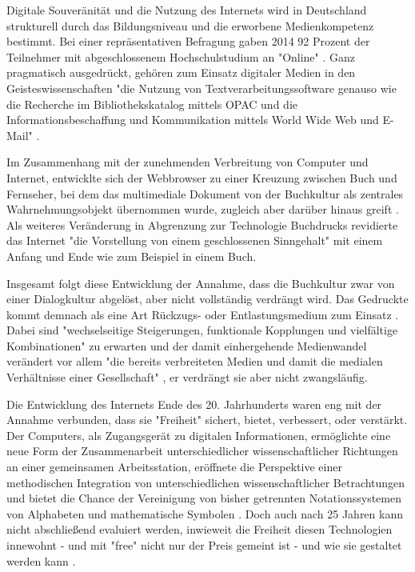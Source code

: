 Digitale Souveränität und die Nutzung des Internets wird in Deutschland strukturell durch das Bildungsniveau und die erworbene Medienkompetenz bestimmt. Bei einer repräsentativen Befragung gaben 2014 92 Prozent der Teilnehmer mit abgeschlossenem Hochschulstudium an "Online" \cite{nonliner_2014}. Ganz pragmatisch ausgedrückt, gehören zum Einsatz digitaler Medien in den Geisteswissenschaften "die Nutzung von Textverarbeitungssoftware genauso wie die Recherche im Bibliothekskatalog mittels OPAC und die Informationsbeschaffung und Kommunikation mittels World Wide Web und E-Mail" \cite{naeder_2010_open}.

Im Zusammenhang mit der zunehmenden Verbreitung von Computer und Internet, entwicklte sich der Webbrowser zu einer Kreuzung zwischen Buch und Fernseher, bei dem das multimediale Dokument von der Buchkultur als zentrales Wahrnehmungsobjekt übernommen wurde, zugleich aber darüber hinaus greift \cite{Warnke_2011}. Als weiteres Veränderung in Abgrenzung zur Technologie Buchdrucks revidierte das Internet "die Vorstellung von einem geschlossenen Sinngehalt" \cite{sandbothe_2000_pragmatische} mit einem Anfang und Ende wie zum Beispiel in einem Buch.

Insgesamt folgt diese Entwicklung der Annahme, dass die Buchkultur zwar von einer Dialogkultur abgelöst, aber nicht vollständig verdrängt wird. Das Gedruckte kommt demnach als eine Art Rückzugs- oder Entlastungsmedium zum Einsatz \cite{hagner_2015_sache_buches}. Dabei sind "wechselseitige Steigerungen, funktionale Kopplungen und vielfältige Kombinationen" zu erwarten und der damit einhergehende Medienwandel verändert vor allem "die bereits verbreiteten Medien und damit die medialen Verhältnisse einer Gesellschaft" \cite{Koenen_1997}, er verdrängt sie aber nicht zwangsläufig.

Die Entwicklung des Internets Ende des 20. Jahrhunderts waren eng mit der Annahme verbunden, dass sie "Freiheit" sichert, bietet, verbessert, oder verstärkt. Der Computers, als Zugangsgerät zu digitalen Informationen, ermöglichte eine neue Form der Zusammenarbeit unterschiedlicher wissenschaftlicher Richtungen an einer gemeinsamen Arbeitsstation, eröffnete die Perspektive einer methodischen Integration von unterschiedlichen wissenschaftlicher Betrachtungen und bietet die Chance der Vereinigung von bisher getrennten Notationssystemen von Alphabeten und mathematische Symbolen \cite{kittler_2004}. Doch auch nach 25 Jahren kann nicht abschließend evaluiert werden, inwieweit die Freiheit diesen Technologien innewohnt - und mit "free" nicht nur der Preis gemeint ist \cite{stallman2002} - und wie sie gestaltet werden kann \cite{kelty_2014_freedom}.


